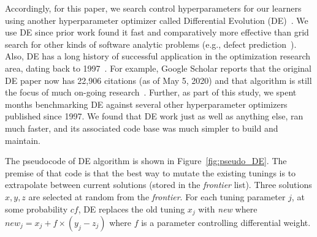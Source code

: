 \documentclass[sigconf,review,anonymous]{acmart}
\newcommand{\fig}[1]{Figure~\ref{fig:#1}}
\begin{document}
Accordingly, for this paper, we search control hyperparameters for our learners using  another hyperparameter optimizer called Differential Evolution (DE)~\cite{storn1997differential}.
We use DE since prior work found it fast and comparatively more effective than grid search for other kinds of software analytic problems (e.g., defect prediction~\cite{fu2016differential,Fu2016TuningFS}). Also, DE has a long history of successful application in the optimization research area, dating back to 1997~\cite{storn1997differential}. For example, Google Scholar reports that the original DE paper now has 22,906 citations (as of May 5, 2020) and that algorithm is still the focus of  much on-going research~\cite{das2010differential,wu2018ensemble,das2016recent}.  Further, as part of this study, we spent months benchmarking DE against several other hyperparameter optimizers published since 1997. We found that DE work just as well as anything else, ran much faster, and its associated code base was much simpler to build and maintain. 

 The pseudocode of DE algorithm is shown in \fig{pseudo_DE}. The premise of that code is that the best way to mutate the existing tunings is to extrapolate between current solutions (stored in the {\em frontier} list). Three solutions $x, y, z$ are selected at random from the {\em frontier}. For each tuning parameter $j$, at some probability $cf$, DE  replaces the old tuning $x_j$ with {\em new}  where
\mbox{$\mathit{new}_j = x_j + f \times (y_j - z_j)$}
where $f$ is a parameter controlling differential weight.  
\end{document}
